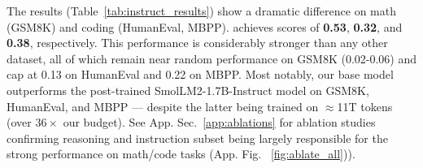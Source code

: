 


The results (Table~\ref{tab:instruct_results}) show a dramatic difference on math (GSM8K) and coding (HumanEval, MBPP). \MixtureVitae{} achieves scores of \textbf{0.53}, \textbf{0.32}, and \textbf{0.38}, respectively. This performance is considerably stronger than any other dataset, all of which remain near random performance on GSM8K (0.02-0.06) and cap at 0.13 on HumanEval and 0.22 on MBPP. Most notably, our base model outperforms the post-trained SmolLM2-1.7B-Instruct \citep{lozhkovsmollm2} model on GSM8K, HumanEval, and MBPP --- despite the latter being trained on $\approx$11T tokens (over $36\times$ our budget). See App. Sec.~\ref{app:ablations} for ablation studies confirming reasoning and instruction subset being largely responsible for the strong performance on math/code tasks (App. Fig. ~\ref{fig:ablate_all})). 






